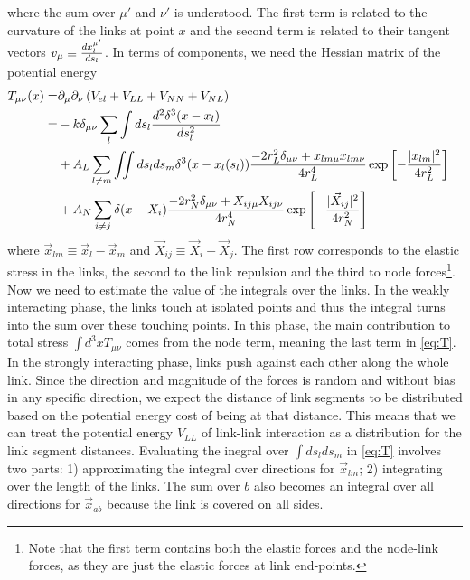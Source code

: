\documentclass[nofootinbib,preprint,floatfix,titlepage,superscriptaddress]{revtex4} %
\begin{document}
where the sum over $\mu'$ and $\nu'$ is understood. 
The first term is related to the curvature of the links at point $x$ and the second term is related to their tangent vectors $v_\mu \equiv {d x_l^{\mu'}\over ds_l}$.  
In terms of components, we need the Hessian matrix of the potential energy
\begin{align}
    T_{\mu\nu}(x) =&  %
    \ro_\mu \ro_\nu \pr{V_{el}+V_{LL} + V_{NN}+V_{NL}} \cr
    =& %
    -{k}\delta_{\mu\nu} \sum_l\int ds_l {d^2 \delta^3(x-x_l)\over ds_l^2} \cr
    & + A_L \sum_{l\ne m} \iint ds_l ds_m \delta^3(x-x_l(s_l))\frac{-2r_L^2\delta_{\mu\nu}+ x_{lm\mu} x_{lm\nu}}{4r_L^4}
     \exp\left[- {|x_{lm}|^2 \over 4 r_L^2}\right]\cr
    &+ A_N\sum_{i\ne j}\delta(x-X_i)\frac{-2r_N^2\delta_{\mu\nu}+ X_{ij\mu}X_{ij\nu}}{4r_N^4}
    \exp\left[- {|\vec{X}_{ij}|^2 \over 4 r_N^2}\right]
    \label{eq:T}
\end{align}
where $\vec{x}_{lm} \equiv \vec{x}_l-\vec{x}_m$ and $\vec{X}_{ij} \equiv \vec{X}_i-\vec{X}_j$. The first row corresponds to the elastic stress in the links, the second to the link repulsion and the third to node forces\footnote{
Note that the first term contains both the elastic forces and the node-link forces, as they are just the elastic forces at link end-points.}. 
Now we need to estimate the value of the integrals over the links.
In the weakly interacting phase, the links touch at isolated points and thus the integral turns into the sum over these touching points. 
In this phase, the main contribution to total stress $\int d^3 x T_{\mu\nu}$ comes from the node term, meaning the last term in \eqref{eq:T}. 
In the strongly interacting phase, links push against each other along the whole link. 
Since the direction and magnitude of the forces is random and without bias in any specific direction, we expect the distance of link segments to be distributed based on the potential energy cost of being at that distance. 
This means that we can treat the potential energy $V_{LL}$ of link-link interaction as a distribution for the link segment distances. 
Evaluating the inegral over $\int ds_lds_m$ in \eqref{eq:T} involves two parts: 1) approximating the integral over directions for $\vec{x}_{lm}$; 2) integrating over the length of the links. 
The sum over $b$ also becomes an integral over all directions for $\vec{x}_{ab}$ because the link is covered on all sides. 
\end{document}
